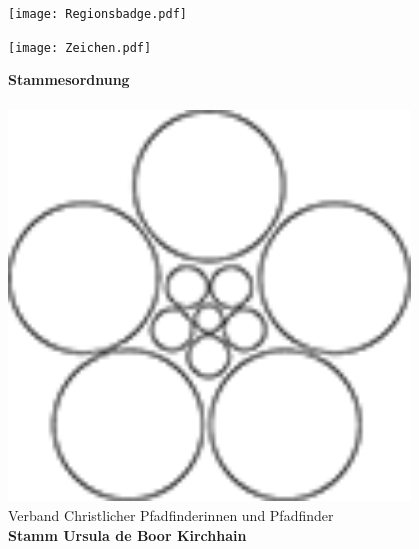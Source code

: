 \documentclass[a4paper]{article}
\newcommand{\name}{Ursula de Boor\xspace}
\newcommand{\ort}{Kirchhain\xspace}
\begin{document}
\thispagestyle{empty}
    
\begin{center}
    \begin{minipage}{.5\textwidth}
      \flushleft
      \texttt{[image: Regionsbadge.pdf]}
    \end{minipage}%
    \begin{minipage}{.5\textwidth}
      \flushright
      \texttt{[image: Zeichen.pdf]}
    \end{minipage}
    
    
    
	{\Huge \textbf{Stammesordnung}}\\
    ~\\[2cm]
    \includegraphics[width=0.8\textwidth]{WeisseRose.png}
    ~\\[2,5cm] 
    
    \normalsize{Verband Christlicher Pfadfinderinnen und Pfadfinder}\\
	\Huge{\textbf{Stamm \name \ort}}
\end{center}


\clearpage
\tableofcontents 
\clearpage
\end{document}
